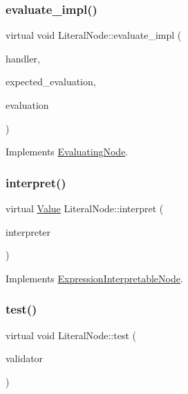 \subsubsection{\texorpdfstring{evaluate\+\_\+impl()}{evaluate\_impl()}}
{\footnotesize\ttfamily virtual void Literal\+Node\+::evaluate\+\_\+impl (\begin{DoxyParamCaption}\item[{\hyperlink{classSystemHandler}{System\+Handler} $\ast$}]{handler,  }\item[{\hyperlink{statics_8h_a6664c451ca7787483a7981cc1de68dbb}{E\+V\+A\+L\+U\+A\+T\+I\+O\+N\+\_\+\+T\+Y\+PE}}]{expected\+\_\+evaluation,  }\item[{struct \hyperlink{structEvaluation}{Evaluation} $\ast$}]{evaluation }\end{DoxyParamCaption})\hspace{0.3cm}{\ttfamily [virtual]}}



Implements \hyperlink{classEvaluatingNode_a085fa06e0b46a93c814dc55cda0c1b26}{Evaluating\+Node}.

\mbox{\label{classLiteralNode_abb32ed943c6a5b2029a496ac04885b2a}} 
\subsubsection{\texorpdfstring{interpret()}{interpret()}}
{\footnotesize\ttfamily virtual \hyperlink{classValue}{Value} Literal\+Node\+::interpret (\begin{DoxyParamCaption}\item[{\hyperlink{classInterpreter}{Interpreter} $\ast$}]{interpreter }\end{DoxyParamCaption})\hspace{0.3cm}{\ttfamily [virtual]}}



Implements \hyperlink{classExpressionInterpretableNode_a43650f046c48fc539f77a207e3c9181e}{Expression\+Interpretable\+Node}.

\mbox{\label{classLiteralNode_af55e4e5e668c9be666c0b6c24c3918f9}} 
\subsubsection{\texorpdfstring{test()}{test()}}
{\footnotesize\ttfamily virtual void Literal\+Node\+::test (\begin{DoxyParamCaption}\item[{\hyperlink{classValidator}{Validator} $\ast$}]{validator }\end{DoxyParamCaption})\hspace{0.3cm}{\ttfamily [virtual]}}



